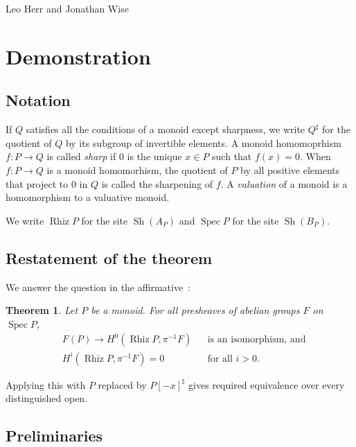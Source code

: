 \documentclass[10pt]{article}
\numberwithin{equation}{section}
\newtheorem{theorem}[paragraph]{Theorem}
\theoremstyle{definition}
\theoremstyle{remark}
\def\Spec{\operatorname{Spec}}
\def\spec{\Spec}
\def\Rh{\operatorname{Rhiz}}
\begin{document}
\begin{center}
{\large Leo Herr and Jonathan Wise}
\end{center}
\section{Demonstration}

\subsection{Notation}

If $Q$ satisfies all the conditions of a monoid except sharpness, we write $Q^\sharp$ for the quotient of $Q$ by its subgroup of invertible elements.  A monoid homomoprhism $f : P \to Q$ is called \emph{sharp} if $0$ is the unique $x \in P$ such that $f(x) = 0$.  When $f : P \to Q$ is a monoid homomorhism, the quotient of $P$ by all positive elements that project to $0$ in $Q$ is called the sharpening of $f$.  A \emph{valuation} of a monoid is a homomorphism to a valuative monoid.

We write $\Rh P$ for the site $\operatorname{Sh}(A_P)$ and $\spec P$ for the site $\operatorname{Sh}(B_P)$.

\subsection{Restatement of the theorem}

We answer the question in the affirmative~:

\begin{theorem} \label{cor:2}
	Let $P$ be a monoid.  For all presheaves of abelian groups $F$ on $\spec P$, 
	\begin{equation*}
		\begin{aligned}
			& F(P) \to H^0(\Rh P, \pi^{-1} F) & & \text{is an isomorphism, and} \\
			& H^i(\Rh P, \pi^{-1} F) = 0 & & \text{for all $i > 0$.}
		\end{aligned}
	\end{equation*}
\end{theorem}

\noindent Applying this with $P$ replaced by $P[-x]^\sharp$ gives required equivalence over every distinguished open.




\subsection{Preliminaries}
\end{document}
